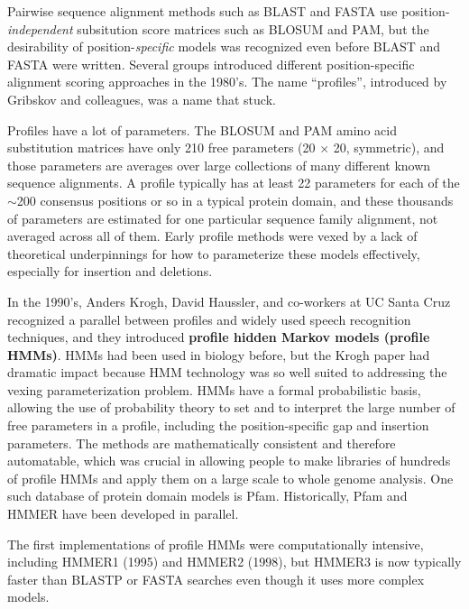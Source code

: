 Pairwise sequence alignment methods such as BLAST and FASTA use
position-\emph{independent} subsitution score matrices such as BLOSUM
and PAM, but the desirability of position-\emph{specific} models was
recognized even before BLAST and FASTA were written.\cite{Doolittle81}
Several groups introduced different position-specific alignment
scoring approaches in the 1980's. The name ``profiles'', introduced by
Gribskov and colleagues,\cite{Gribskov87} was a name that stuck.

Profiles have a lot of parameters.  The BLOSUM and PAM amino acid
substitution matrices have only 210 free parameters (20 $\times$ 20,
symmetric), and those parameters are averages over large collections
of many different known sequence alignments. A profile typically has
at least 22 parameters  for each of the $\sim$200 consensus positions or so in a
typical protein domain, and these thousands of parameters are
estimated for one particular sequence family alignment, not averaged
across all of them. Early profile methods were vexed by a lack of
theoretical underpinnings for how to parameterize these models
effectively, especially for insertion and deletions.

In the 1990's, Anders Krogh, David Haussler, and co-workers at UC
Santa Cruz recognized a parallel between profiles and widely used
speech recognition techniques, and they introduced \textbf{profile
  hidden Markov models (profile HMMs)}.\cite{Krogh94} HMMs had been
used in biology before, but the Krogh paper had dramatic impact
because HMM technology was so well suited to addressing the vexing
parameterization problem. HMMs have a formal probabilistic basis,
allowing the use of probability theory to set and to interpret the
large number of free parameters in a profile, including the
position-specific gap and insertion parameters. The methods are
mathematically consistent and therefore automatable, which was crucial
in allowing people to make libraries of hundreds of profile HMMs and
apply them on a large scale to whole genome analysis.  One such
database of protein domain models is Pfam.\cite{Sonnhammer97}
Historically, Pfam and HMMER have been developed in parallel.

The first implementations of profile HMMs were computationally
intensive, including HMMER1 (1995) and HMMER2 (1998), but HMMER3 is
now typically faster than BLASTP or FASTA searches even though it uses
more complex models.




